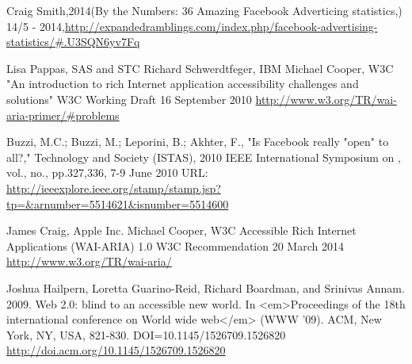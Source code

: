 \documentclass[conference]{IEEEtran}
\begin{document}
\begin{thebibliography}{1}
Craig Smith,2014(By the Numbers: 36 Amazing Facebook Adverticing statistics,) 14/5 - 2014,\href{http://expandedramblings.com/index.php/facebook-advertising-statistics/\#.U3SQN6yv7Fq}{http://expandedramblings.com/index.php/facebook-advertising-statistics/\#.U3SQN6yv7Fq}

%
%
%
%


Lisa Pappas, SAS and STC
Richard Schwerdtfeger, IBM
Michael Cooper, W3C
"An introduction to rich Internet application accessibility challenges and solutions"
W3C Working Draft 16 September 2010
\href{http://www.w3.org/TR/wai-aria-primer/\#problems}{http://www.w3.org/TR/wai-aria-primer/\#problems }

Buzzi, M.C.; Buzzi, M.; Leporini, B.; Akhter, F., "Is Facebook really "open" to
all?," Technology and Society (ISTAS), 2010 IEEE International Symposium on ,
vol., no., pp.327,336, 7-9 June 2010
URL: \href{http://ieeexplore.ieee.org/stamp/stamp.jsp?tp=\&arnumber=5514621\&isnumber=5514600}{http://ieeexplore.ieee.org/stamp/stamp.jsp?tp=\&arnumber=5514621\&isnumber=5514600}

James Craig, Apple Inc.
Michael Cooper, W3C
Accessible Rich Internet Applications (WAI-ARIA) 1.0
W3C Recommendation 20 March 2014
\url{http://www.w3.org/TR/wai-aria/ }

Joshua Hailpern, Loretta Guarino-Reid, Richard Boardman, and Srinivas Annam.
2009. Web 2.0: blind to an accessible new world. In <em>Proceedings of the
18th international conference on World wide web</em> (WWW '09). ACM, New York,
NY, USA, 821-830. DOI=10.1145/1526709.1526820
\href{http://doi.acm.org/10.1145/1526709.1526820}{http://doi.acm.org/10.1145/1526709.1526820}


\end{thebibliography}
\end{document}
